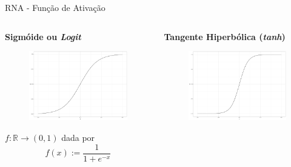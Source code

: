 \documentclass{beamer}
\newcommand{\R}{\mathds{R}}
\begin{document}
    \begin{frame}{RNA - Função de Ativação}
        \begin{columns}[onlytextwidth,t]
            \begin{column}{0.48\textwidth}
                \centering
                \textbf{Sigmóide ou \textit{Logit}}
                
                \begin{figure}
                    \includegraphics[scale=0.12]{figuras/sigmoid.pdf}
	            \end{figure}
	               
	            $f: \R \rightarrow (0,1)$ dada por 
	            \[f(x) := \frac{1}{1 + e^{-x}}\]
	            
            \end{column}

            \begin{column}{0.48\textwidth}
                \centering
                \textbf{Tangente Hiperbólica (\textit{tanh})}
            
                \begin{figure}
                     \includegraphics[scale=0.12]{figuras/tanh.pdf}
	            \end{figure}
	            

\end{column}
\end{columns}
\end{frame}
\end{document}
